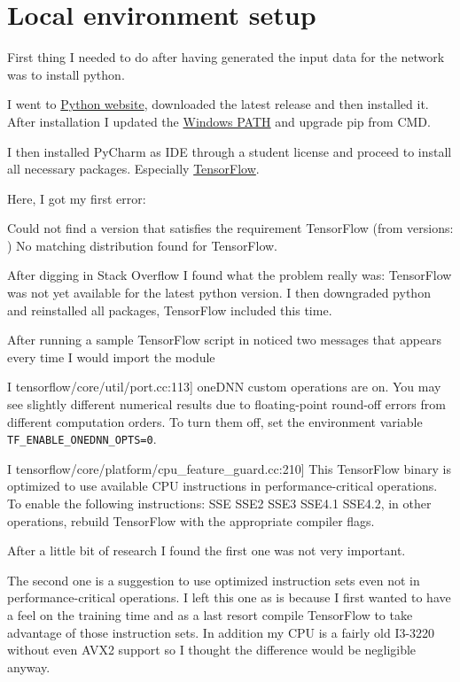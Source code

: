 \documentclass[
  letterpaper,
  DIV=11,
  numbers=noendperiod]{scrreprt}
\begin{document}
\hypertarget{local-environment-setup}{%
\chapter{Local environment setup}\label{local-environment-setup}}

First thing I needed to do after having generated the input data for the
network was to install python.

I went to \href{https://www.python.org/downloads/}{Python website},
downloaded the latest release and then installed it. After installation
I updated the
\href{https://datatofish.com/add-python-to-windows-path/}{Windows PATH}
and upgrade pip from CMD.

I then installed PyCharm as IDE through a student license and proceed to
install all necessary packages. Especially
\href{https://www.tensorflow.org/}{TensorFlow}.

Here, I got my first error:

Could not find a version that satisfies the requirement TensorFlow (from
versions: ) No matching distribution found for TensorFlow.

After digging in Stack Overflow I found what the problem really was:
TensorFlow was not yet available for the latest python version. I then
downgraded python and reinstalled all packages, TensorFlow included this
time.

After running a sample TensorFlow script in noticed two messages that
appears every time I would import the module

I tensorflow/core/util/port.cc:113{]} oneDNN custom operations are on.
You may see slightly different numerical results due to floating-point
round-off errors from different computation orders. To turn them off,
set the environment variable \texttt{TF\_ENABLE\_ONEDNN\_OPTS=0}.

I tensorflow/core/platform/cpu\_feature\_guard.cc:210{]} This TensorFlow
binary is optimized to use available CPU instructions in
performance-critical operations. To enable the following instructions:
SSE SSE2 SSE3 SSE4.1 SSE4.2, in other operations, rebuild TensorFlow
with the appropriate compiler flags.

After a little bit of research I found the first one was not very
important.

The second one is a suggestion to use optimized instruction sets even
not in performance-critical operations. I left this one as is because I
first wanted to have a feel on the training time and as a last resort
compile TensorFlow to take advantage of those instruction sets. In
addition my CPU is a fairly old I3-3220 without even AVX2 support so I
thought the difference would be negligible anyway.
\end{document}
